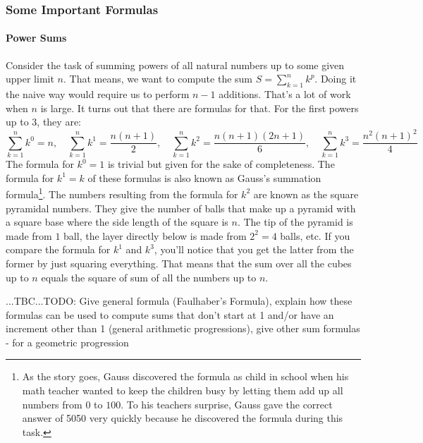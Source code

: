 \subsubsection{Some Important Formulas}

\paragraph{Power Sums}
Consider the task of summing powers of all natural numbers up to some given upper limit $n$. That means, we want to compute the sum $S = \sum_{k=1}^{n} k^p$. Doing it the naive way would require us to perform $n-1$ additions. That's a lot of work when $n$ is large. It turns out that there are formulas for that. For the first powers up to 3, they are:
\begin{equation}
\sum_{k=1}^{n} k^0 = n, \quad
\sum_{k=1}^{n} k^1 = \frac{n (n+1)}{2}, \quad
\sum_{k=1}^{n} k^2 = \frac{n (n+1) (2 n  + 1) }{6}, \quad
\sum_{k=1}^{n} k^3 = \frac{n^2 (n+1)^2}{4}
\end{equation}
The formula for $k^0 = 1$ is trivial but given for the sake of completeness. The formula for $k^1 = k$ of these formulas is also known as Gauss's summation formula\footnote{As the story goes, Gauss discovered the formula as child in school when his math teacher wanted to keep the children busy by letting them add up all numbers from $0$ to $100$. To his teachers surprise, Gauss gave the correct answer of 5050 very quickly because he discovered the formula during this task.}. The numbers resulting from the formula for $k^2$ are known as the square pyramidal numbers. They give the number of balls that make up a pyramid with a square base where the side length of the square is $n$. The tip of the pyramid is made from $1$ ball, the layer directly below is made from $2^2 = 4$ balls, etc. If you compare the formula for $k^1$ and $k^3$, you'll notice that you get the latter from the former by just squaring everything. That means that the sum over all the cubes up to $n$ equals the square of sum of all the numbers up to $n$.

...TBC...TODO: Give general formula (Faulhaber's Formula), explain how these formulas can be used to compute sums that don't start at 1 and/or have an increment other than 1 (general arithmetic progressions), give other sum formulas - for a geometric progression




